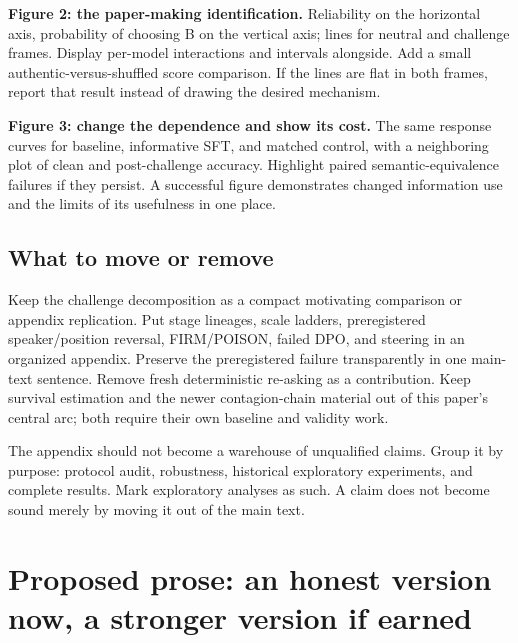 \documentclass[11pt]{article}
\begin{document}
\textbf{Figure 2: the paper-making identification.} Reliability on the horizontal axis, probability of choosing B on the vertical axis; lines for neutral and challenge frames. Display per-model interactions and intervals alongside. Add a small authentic-versus-shuffled score comparison. If the lines are flat in both frames, report that result instead of drawing the desired mechanism.

\textbf{Figure 3: change the dependence and show its cost.} The same response curves for baseline, informative SFT, and matched control, with a neighboring plot of clean and post-challenge accuracy. Highlight paired semantic-equivalence failures if they persist. A successful figure demonstrates changed information use and the limits of its usefulness in one place.

\subsection{What to move or remove}
Keep the challenge decomposition as a compact motivating comparison or appendix replication. Put stage lineages, scale ladders, preregistered speaker/position reversal, FIRM/POISON, failed DPO, and steering in an organized appendix. Preserve the preregistered failure transparently in one main-text sentence. Remove fresh deterministic re-asking as a contribution. Keep survival estimation and the newer contagion-chain material out of this paper's central arc; both require their own baseline and validity work.

The appendix should not become a warehouse of unqualified claims. Group it by purpose: protocol audit, robustness, historical exploratory experiments, and complete results. Mark exploratory analyses as such. A claim does not become sound merely by moving it out of the main text.


\section{Proposed prose: an honest version now, a stronger version if earned}
\end{document}
